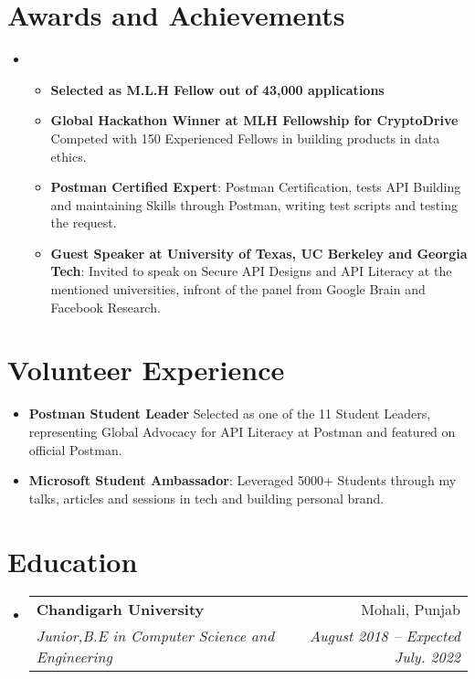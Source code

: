 \documentclass[letterpaper,11pt]{article}
\makeatletter
\newcommand{\resumeItem}[1]{
  \item\small{
    {#1 \vspace{-2pt}}
  }
}
\newcommand{\resumeSubheading}[4]{
  \vspace{-2pt}\item
    \begin{tabular*}{0.97\textwidth}[t]{l@{\extracolsep{\fill}}r}
      \textbf{#1} & #2 \\
      \textit{\small#3} & \textit{\small #4} \\
    \end{tabular*}\vspace{-7pt}
}
\newcommand{\resumeSubHeadingListStart}{\begin{itemize}[leftmargin=0.15in, label={}]}
\newcommand{\resumeSubHeadingListEnd}{\end{itemize}}
\newcommand{\resumeItemListStart}{\begin{itemize}}
\newcommand{\resumeItemListEnd}{\end{itemize}\vspace{-5pt}}
\makeatother
\begin{document}
\section{Awards and Achievements}
 \begin{itemize}[leftmargin=0.15in, label={}]
    \small\item{\resumeItemListStart
        \resumeItem{\textbf{Selected as M.L.H Fellow out of 43,000 applications}}
        \resumeItem{\textbf{Global Hackathon Winner at MLH Fellowship for CryptoDrive} Competed with 150 Experienced Fellows in building products in data ethics. }
        \resumeItem{\textbf{Postman Certified Expert}: Postman Certification, tests API Building and maintaining Skills through Postman, writing test scripts and testing the request. }
        \resumeItem{\textbf{Guest Speaker at University of Texas, UC Berkeley and Georgia Tech}: Invited to speak on Secure API Designs and API Literacy at the mentioned universities, infront of the panel from Google Brain and Facebook Research.}
      \resumeItemListEnd
    }
 \end{itemize}
 \section{Volunteer Experience}
 \begin{itemize}[leftmargin=0.15in, label={}]
    \small{\item{
        \resumeItemListStart
        \resumeItem{\textbf{Postman Student Leader} Selected as one of the 11 Student Leaders, representing Global Advocacy for API Literacy at Postman and featured on official Postman.}
        \resumeItem{\textbf{Microsoft Student Ambassador}: Leveraged 5000+ Students through my talks, articles and sessions in tech and building personal brand.}
      \resumeItemListEnd
    }}
 \end{itemize}
\section{Education}
  \resumeSubHeadingListStart
    \resumeSubheading
      {Chandigarh University}{Mohali, Punjab}
      {Junior,B.E in Computer Science and Engineering}{August 2018 -- Expected July. 2022}
  \resumeSubHeadingListEnd
\end{document}
